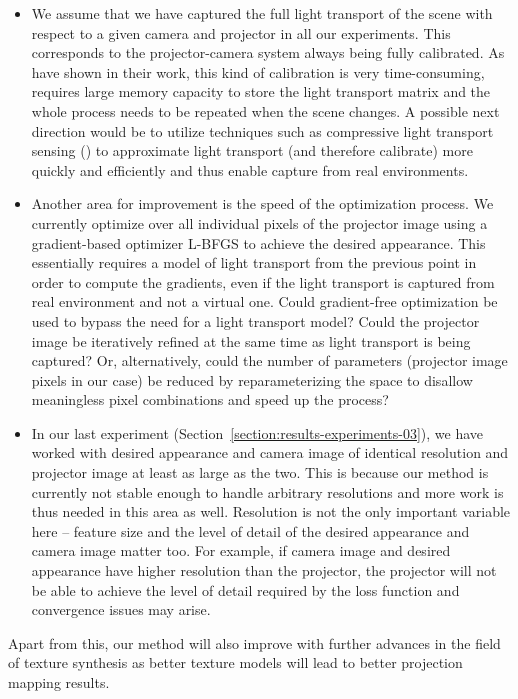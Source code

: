 \begin{itemize}
    \item We assume that we have captured the full light transport of the scene with respect to a given camera and projector in all our experiments. This corresponds to the projector-camera system always being fully calibrated. As \citet{Wetzstein2007} have shown in their work, this kind of calibration is very time-consuming, requires large memory capacity to store the light transport matrix and the whole process needs to be repeated when the scene changes. A possible next direction would be to utilize techniques such as compressive light transport sensing (\citet{Peers2009}) to approximate light transport (and therefore calibrate) more quickly and efficiently and thus enable capture from real environments.
    \item Another area for improvement is the speed of the optimization process. We currently optimize over all individual pixels of the projector image using a gradient-based optimizer L-BFGS to achieve the desired appearance. This essentially requires a model of light transport from the previous point in order to compute the gradients, even if the light transport is captured from real environment and not a virtual one. Could gradient-free optimization be used to bypass the need for a light transport model? Could the projector image be iteratively refined at the same time as light transport is being captured? Or, alternatively, could the number of parameters (projector image pixels in our case) be reduced by reparameterizing the space to disallow meaningless pixel combinations and speed up the process?
    \item In our last experiment (Section~\ref{section:results-experiments-03}), we have worked with desired appearance and camera image of identical resolution and projector image at least as large as the two. This is because our method is currently not stable enough to handle arbitrary resolutions and more work is thus needed in this area as well. Resolution is not the only important variable here -- feature size and the level of detail of the desired appearance and camera image matter too. For example, if camera image and desired appearance have higher resolution than the projector, the projector will not be able to achieve the level of detail required by the loss function and convergence issues may arise.
\end{itemize}

Apart from this, our method will also improve with further advances in the field of texture synthesis as better texture models will lead to better projection mapping results.